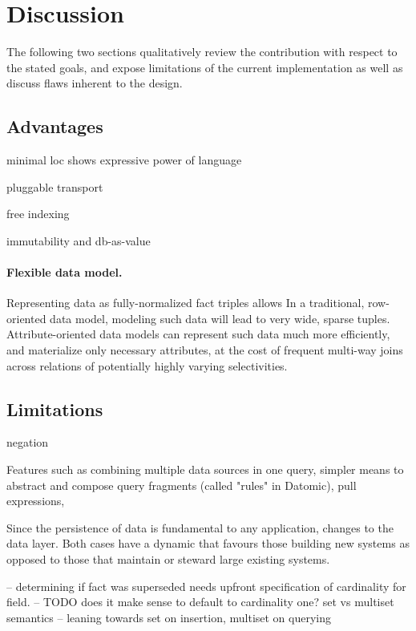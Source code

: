 \cleardoublepage
\section{Discussion}\label{sec:discussion}

The following two sections qualitatively review the contribution with respect to the stated goals, and expose limitations of the current implementation as well as discuss flaws inherent to the design.

\subsection{Advantages}

minimal loc shows expressive power of language

pluggable transport

free indexing

immutability and db-as-value

\paragraph{Flexible data model.} Representing data as fully-normalized fact triples allows
In a traditional, row-oriented data model, modeling such data will lead to very wide, sparse tuples. Attribute-oriented data models can represent such data much more efficiently, and materialize only necessary attributes, at the cost of frequent multi-way joins across relations of potentially highly varying selectivities. \cite{gobel2019optimising}


\subsection{Limitations}

negation

Features such as combining multiple data sources in one query, simpler means to abstract and compose query fragments (called "rules" in Datomic), pull expressions,

Since the persistence of data is fundamental to any application, changes to the data layer.
Both cases have a dynamic that favours those building new systems as opposed to those that maintain or steward large existing systems.

-- determining if fact was superseded needs upfront specification of cardinality for field.
-- TODO does it make sense to default to cardinality one?
set vs multiset semantics -- leaning towards set on insertion, multiset on querying




